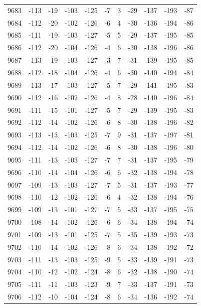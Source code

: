 \begin{table}[H]
\begin{tabular}{lllllllllll}
9683 & -113 & -19 & -103 & -125 & -7 & 3 & -29 & -137 & -193 & -87 \\
9684 & -112 & -20 & -102 & -126 & -6 & 4 & -30 & -136 & -194 & -86 \\
9685 & -111 & -19 & -103 & -127 & -5 & 5 & -29 & -137 & -195 & -85 \\
9686 & -112 & -20 & -104 & -126 & -4 & 6 & -30 & -138 & -196 & -86 \\
9687 & -113 & -19 & -103 & -127 & -3 & 7 & -31 & -139 & -195 & -85 \\
9688 & -112 & -18 & -104 & -126 & -4 & 6 & -30 & -140 & -194 & -84 \\
9689 & -113 & -17 & -103 & -127 & -5 & 7 & -29 & -141 & -195 & -83 \\
9690 & -112 & -16 & -102 & -126 & -4 & 8 & -28 & -140 & -196 & -84 \\
9691 & -111 & -15 & -101 & -127 & -5 & 7 & -29 & -139 & -195 & -83 \\
9692 & -112 & -14 & -102 & -126 & -6 & 8 & -30 & -138 & -196 & -82 \\
9693 & -113 & -13 & -103 & -125 & -7 & 9 & -31 & -137 & -197 & -81 \\
9694 & -112 & -14 & -102 & -126 & -6 & 8 & -30 & -138 & -196 & -80 \\
9695 & -111 & -13 & -103 & -127 & -7 & 7 & -31 & -137 & -195 & -79 \\
9696 & -110 & -14 & -104 & -126 & -6 & 6 & -32 & -138 & -194 & -78 \\
9697 & -109 & -13 & -103 & -127 & -7 & 5 & -31 & -137 & -193 & -77 \\
9698 & -110 & -12 & -102 & -126 & -6 & 4 & -32 & -138 & -194 & -76 \\
9699 & -109 & -13 & -101 & -127 & -7 & 5 & -33 & -137 & -195 & -75 \\
9700 & -108 & -14 & -102 & -126 & -6 & 6 & -34 & -138 & -194 & -74 \\
9701 & -109 & -13 & -101 & -125 & -7 & 5 & -35 & -139 & -193 & -73 \\
9702 & -110 & -14 & -102 & -126 & -8 & 6 & -34 & -138 & -192 & -72 \\
9703 & -111 & -13 & -103 & -125 & -9 & 5 & -33 & -139 & -191 & -73 \\
9704 & -110 & -12 & -102 & -124 & -8 & 6 & -32 & -138 & -190 & -74 \\
9705 & -111 & -11 & -103 & -123 & -9 & 7 & -33 & -137 & -191 & -73 \\
9706 & -112 & -10 & -104 & -124 & -8 & 6 & -34 & -136 & -192 & -74 \\

\end{tabular}
\end{table}
